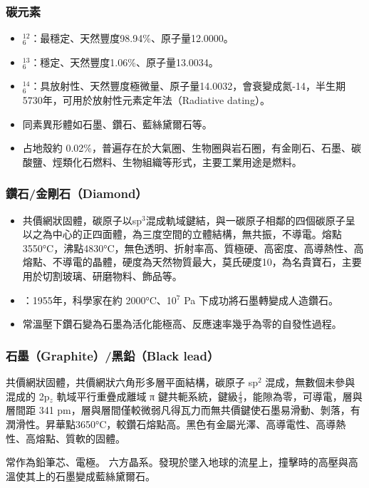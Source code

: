\documentclass[a4paper,12pt]{report}
\begin{document}
\subsubsection{碳元素}
\begin{itemize}
\item $^{12}_6$\rmC：最穩定、天然豐度98.94\%、原子量12.0000。
\item $^{13}_6$\rmC：穩定、天然豐度1.06\%、原子量13.0034。
\item $^{14}_6$\rmC：具放射性、天然豐度極微量、原子量14.0032，會衰變成氮-14，半生期5730年，可用於放射性元素定年法（Radiative dating）。
\item 同素異形體如石墨、鑽石、藍絲黛爾石等。
\item 占地殼約 0.02\%，普遍存在於大氣圈、生物圈與岩石圈，有金剛石、石墨、碳酸鹽、烴類化石燃料、生物組織等形式，主要工業用途是燃料。
\end{itemize}
\subsubsection{鑽石/金剛石（Diamond）}
\begin{itemize}
\item 共價網狀固體，碳原子以sp$^3$混成軌域鍵結，與一碳原子相鄰的四個碳原子呈以之為中心的正四面體，為三度空間的立體結構，無共振，不導電。熔點3550°C，沸點4830°C，無色透明、折射率高、質極硬、高密度、高導熱性、高熔點、不導電的晶體，硬度為天然物質最大，莫氏硬度10，為名貴寶石，主要用於切割玻璃、研磨物料、飾品等。
\item {}：1955年，科學家在約 2000°C、10$^7$ Pa 下成功將石墨轉變成人造鑽石。
\item 常溫壓下鑽石變為石墨為活化能極高、反應速率幾乎為零的自發性過程。
\end{itemize}
\subsubsection{石墨（Graphite）/黑鉛（Black lead）}
\bit
\item 共價網狀固體，共價網狀六角形多層平面結構，碳原子 sp$^2$ 混成，無數個未參與混成的 2p$_z$ 軌域平行重疊成離域 π 鍵共軛系統，鍵級$\frac{4}{3}$，能隙為零，可導電，層與層間距 341 pm，層與層間僅較微弱凡得瓦力而無共價鍵使石墨易滑動、剝落，有潤滑性。昇華點3650°C，較鑽石熔點高。黑色有金屬光澤、高導電性、高導熱性、高熔點、質軟的固體。
\item 常作為鉛筆芯、電極。
\eit
{}
六方晶系。發現於墜入地球的流星上，撞擊時的高壓與高溫使其上的石墨變成藍絲黛爾石。
\end{document}
